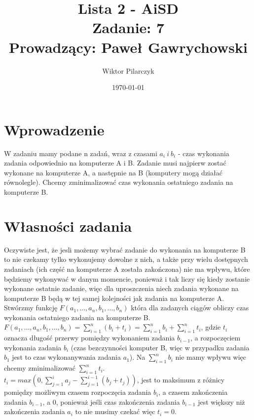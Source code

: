 \documentclass{article}
\author{Wiktor Pilarczyk}
\title{Lista 2 - AiSD\\\large{Zadanie: 7}\\\large{Prowadzący: Paweł Gawrychowski}}
\date{\today}
\begin{document}
\maketitle
\section{Wprowadzenie}
W zadaniu mamy podane n zadań, wraz z czasami $a_{i} \ i \  b_{i}$ - czas wykonania zadania odpowiednio na komputerze A i B. Zadanie musi najpierw zostać wykonane na komputerze A, a następnie na B (komputery mogą działać równolegle). Chcemy zminimalizować czas wykonania ostatniego zadania na komputerze B.

\section{Własności zadania}
Oczywiste jest, że jesli możemy wybrać zadanie do wykonania na komputerze B to nie czekamy tylko wykonujemy dowolne z nich, a także przy wielu dostępnych zadaniach (ich część na komputerze A została zakończona) nie ma wpływu, które będziemy wykonywać w danym momencie, ponieważ i tak liczy się kiedy zostanie wykonane ostatnie zadanie, więc dla uproszczenia niech zadania wykonane na komputerze B będą w tej samej kolejności jak zadania na komputerze A.\\

Stwórzmy funkcję $F(a_{1},...,a_{n}, b_{1}, ..., b_{n})$ która dla zadanych ciągów obliczy czas wykonania ostatniego zadania na komputerze B.\\

$F(a_{1},...,a_{n}, b_{1}, ..., b_{n}) = \sum_{i=1}^{n} (b_{i} + t_{i}) = \sum_{i=1}^{n} b_{i} + \sum_{i=1}^{n} t_{i}$, gdzie $t_{i}$ oznacza długość przerwy pomiędzy wykonaniem zadania $b_{i-1}$, a rozpoczęciem wykonania zadania $b_{i}$ (czas bezczynności komputer B, więc w przypadku zadania $b_{1}$ jest to czas wykonanywania zadania $a_{1}$). Na $\sum_{i=1}^{n} b_{i}$ nie mamy wpływu więc chcemy zminimalizować $\sum_{i=1}^{n} t_{i}$.\\

$t_{i} = max(0, \sum_{j=1}^{i} a_{j} - \sum_{j=1}^{i-1} (b_{j} + t_{j}))$, jest to maksimum z różnicy pomiędzy możliwym czasem rozpoczęcia zadania $b_{i}$, a czasem zakończenia zadania $b_{i-1}$, a 0, ponieważ jeśli  czas zakończenia zadania $b_{i-1}$ jest większy niż zakończenia zadania $a_{i}$ to nie musimy czekać więc $t_{i} = 0$.\\ \\ \\
\end{document}
